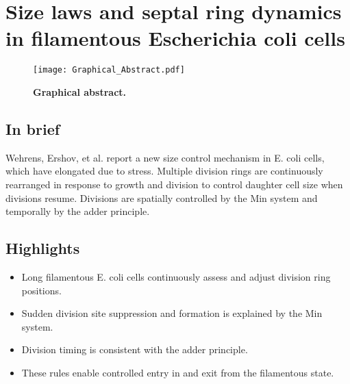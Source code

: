 

\chapter{Size laws and septal ring dynamics in filamentous Escherichia coli cells}
\label{chapter:filarecovery}



\begin{figure}[t]
    \centering
    \texttt{[image: Graphical\_Abstract.pdf]} %
    \caption*{ 
        \centering        
        \textbf{Graphical abstract.}
    }
    \label{fig:filarecovery:graphicalabstract}
\end{figure}

\section*{In brief}
Wehrens, Ershov, et al. report a new size control mechanism in E. coli cells, which have elongated due to stress. Multiple division rings are continuously rearranged in response to growth and division to control daughter cell size when divisions resume. Divisions are spatially controlled by the Min system and temporally by the adder principle.

\section*{Highlights}
\begin{itemize}[itemsep=1pt,parsep=1pt]
    \item Long filamentous E. coli cells continuously assess and adjust division ring positions.
    \item Sudden division site suppression and formation is explained by the Min system.
    \item Division timing is consistent with the adder principle.
    \item These rules enable controlled entry in and exit from the filamentous state.
\end{itemize}

\clearpage

